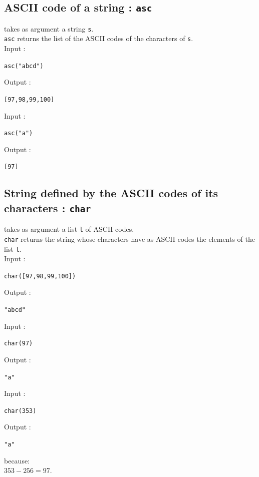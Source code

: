 \documentclass[a4paper,11pt]{book}
\begin{document}
\subsection{ASCII code of a string : {\tt asc}}
 takes as argument a string {\tt s}.\\
{\tt asc} returns the list of the ASCII codes of the characters of {\tt s}.\\
Input :
\begin{center}{\tt asc("abcd")}\end{center}
Output :
\begin{center}{\tt [97,98,99,100]}\end{center} 
Input :
\begin{center}{\tt asc("a")}\end{center}
Output :
\begin{center}{\tt [97]}\end{center}

\subsection{String defined by the ASCII codes of its characters : {\tt char}}
 takes as argument a list {\tt l} of ASCII codes.\\ 
{\tt char} returns the string whose characters have as ASCII codes the 
elements of the list {\tt l}.\\
Input :
\begin{center}{\tt char([97,98,99,100])}\end{center}
Output :
\begin{center}{\tt "abcd"}\end{center} 
Input :
\begin{center}{\tt char(97)}\end{center}
Output :
\begin{center}{\tt "a"}\end{center}
Input :
\begin{center}{\tt char(353)}\end{center}
Output :
\begin{center}{\tt "a"}\end{center}
because:\\
$353-256=97$.
\end{document}
